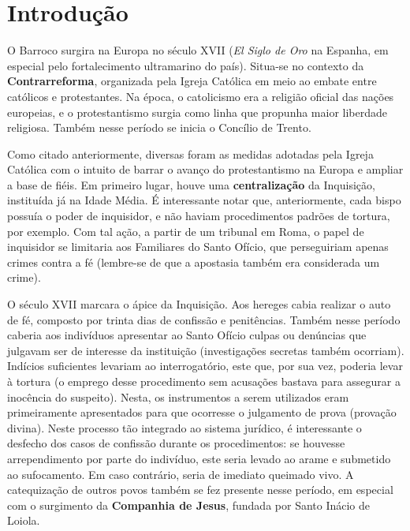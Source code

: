 
\chapter{Introdução}

O Barroco surgira na Europa no século XVII (\textit{El Siglo de Oro} na Espanha, em especial pelo fortalecimento ultramarino do país). Situa-se no contexto da \textbf{Contrarreforma}, organizada pela Igreja Católica em meio ao embate entre católicos e protestantes. Na época, o catolicismo era a religião oficial das nações europeias, e o protestantismo surgia como linha que propunha maior liberdade religiosa. Também nesse período se inicia o Concílio de Trento.

Como citado anteriormente, diversas foram as medidas adotadas pela Igreja Católica com o intuito de barrar o avanço do protestantismo na Europa e ampliar a base de fiéis. Em primeiro lugar, houve uma \textbf{centralização} da Inquisição, instituída já na Idade Média. É interessante notar que, anteriormente, cada bispo possuía o poder de inquisidor, e não haviam procedimentos padrões de tortura, por exemplo. Com tal ação, a partir de um tribunal em Roma, o papel de inquisidor se limitaria aos Familiares do Santo Ofício, que perseguiriam apenas crimes contra a fé (lembre-se de que a apostasia também era considerada um crime). 

O século XVII marcara o ápice da Inquisição. Aos hereges cabia realizar o auto de fé, composto por trinta dias de confissão e penitências. Também nesse período caberia aos indivíduos apresentar ao Santo Ofício culpas ou denúncias que julgavam ser de interesse da instituição (investigações secretas também ocorriam). Indícios suficientes levariam ao interrogatório, este que, por sua vez, poderia levar à tortura (o emprego desse procedimento sem acusações bastava para assegurar a inocência do suspeito). Nesta, os instrumentos a serem utilizados eram primeiramente apresentados para que ocorresse o julgamento de prova (provação divina). Neste processo tão integrado ao sistema jurídico, é interessante o desfecho dos casos de confissão durante os procedimentos: se houvesse arrependimento por parte do indivíduo, este seria levado ao arame e submetido ao sufocamento. Em caso contrário, seria de imediato queimado vivo. A catequização de outros povos também se fez presente nesse período, em especial com o surgimento da \textbf{Companhia de Jesus}, fundada por Santo Inácio de Loiola.

